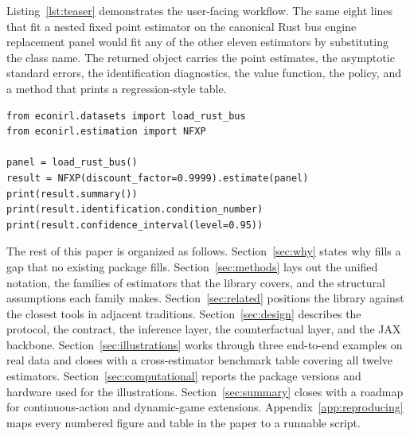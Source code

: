 Listing~\ref{lst:teaser} demonstrates the user-facing workflow. The same eight lines that fit a nested fixed point estimator on the canonical Rust bus engine replacement panel would fit any of the other eleven estimators by substituting the class name. The returned  object carries the point estimates, the asymptotic standard errors, the identification diagnostics, the value function, the policy, and a  method that prints a regression-style table.

\begin{lstlisting}[style=econirlpython,caption={Fitting NFXP on the Rust bus panel and printing the result. Reproduced by \code{code\_snippets/teaser\_nfxp\_rust.py}.},label={lst:teaser}]
from econirl.datasets import load_rust_bus
from econirl.estimation import NFXP

panel = load_rust_bus()
result = NFXP(discount_factor=0.9999).estimate(panel)
print(result.summary())
print(result.identification.condition_number)
print(result.confidence_interval(level=0.95))
\end{lstlisting}

The rest of this paper is organized as follows. Section~\ref{sec:why} states why  fills a gap that no existing package fills. Section~\ref{sec:methods} lays out the unified notation, the families of estimators that the library covers, and the structural assumptions each family makes. Section~\ref{sec:related} positions the library against the closest tools in adjacent traditions. Section~\ref{sec:design} describes the  protocol, the  contract, the inference layer, the counterfactual layer, and the JAX backbone. Section~\ref{sec:illustrations} works through three end-to-end examples on real data and closes with a cross-estimator benchmark table covering all twelve estimators. Section~\ref{sec:computational} reports the package versions and hardware used for the illustrations. Section~\ref{sec:summary} closes with a roadmap for continuous-action and dynamic-game extensions. Appendix~\ref{app:reproducing} maps every numbered figure and table in the paper to a runnable script.
